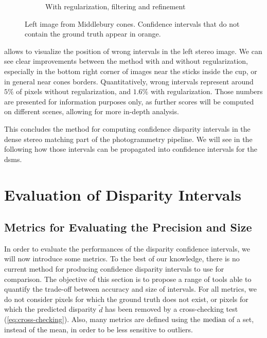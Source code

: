 \begin{figure}
\begin{subfigure}[t]{0.49\linewidth}
        \caption{With regularization, filtering and refinement}
        \label{fig:comparison_wrong_intervals_reg}
    \end{subfigure}
    \caption{Left image from Middlebury cones. Confidence intervals that do not contain the ground truth appear in orange.}
    \label{fig:comparison_wrong_intervals}
\end{figure}

 allows to visualize the position of wrong intervals in the left stereo image. We can see clear improvements between the method with and without regularization, especially in the bottom right corner of images near the sticks inside the cup, or in general near cones borders. Quantitatively, wrong intervals represent around $5\%$ of pixels without regularization, and $1.6\%$ with regularization. Those numbers are presented for information purposes only, as further scores will be computed on different scenes, allowing for more in-depth analysis.

This concludes the method for computing confidence disparity intervals in the dense stereo matching part of the photogrammetry pipeline. We will see in the following how those intervals can be propagated into confidence intervals for the \acrshort{dsm}s.


\section{Evaluation of Disparity Intervals}
\subsection{Metrics for Evaluating the Precision and Size}\label{sec:metrics_disparity}
In order to evaluate the performances of the disparity confidence intervals, we will now introduce some metrics. To the best of our knowledge, there is no current method for producing confidence disparity intervals to use for comparison. The objective of this section is to propose a range of tools able to quantify the trade-off between accuracy and size of intervals. For all metrics, we do not consider pixels for which the ground truth does not exist, or pixels for which the predicted disparity $\tilde{d}$ has been removed by a cross-checking test (\cref{eq:cross-checking}). Also, many metrics are defined using the $\operatorname*{median}$ of a set, instead of the mean, in order to be less sensitive to outliers. 


